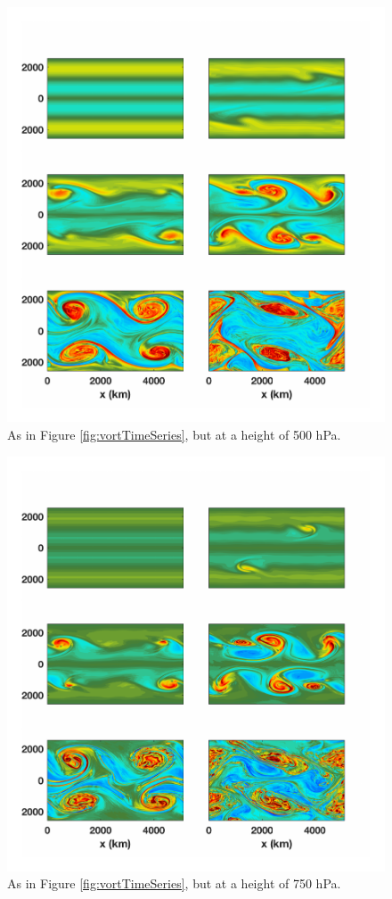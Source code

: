 \begin{figure}[H]
\includegraphics[scale=1]{Chapter3/img/vort_height_50}
\caption{As in Figure \ref{fig:vortTimeSeries}, but at a height of 500 hPa.}
\label{fig:vort_height_25}
\end{figure}

\begin{figure}[H]
\includegraphics[scale=1]{Chapter3/img/vort_height_25}
\caption{As in Figure \ref{fig:vortTimeSeries}, but at a height of 750 hPa.}
\label{fig:vort_height_50}
\end{figure}

